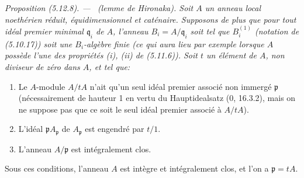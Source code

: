 \documentclass[10pt,oneside]{book}
\newenvironment{proposition}[1][]{%
  \par\medskip\noindent\itshape Proposition (#1). ---\ }{\par}
\begin{document}
\begin{proposition}[5.12.8]
\label{IV.2.s5.12.8-fr}
(lemme de Hironaka). Soit $A$ un anneau local noethérien réduit,
équidimensionnel et caténaire. Supposons de plus que pour tout idéal premier
minimal $\mathfrak q_i$ de $A$, l'anneau $B_i=A/\mathfrak q_i$ soit tel que
$B_i^{(1)}$ (notation de (5.10.17)) soit une $B_i$-algèbre finie (ce qui aura
lieu par exemple lorsque $A$ possède l'une des propriétés (i), (ii) de
(5.11.6)). Soit $t$ un élément de $A$, non diviseur de zéro dans $A$, et tel
que:
\begin{enumerate}
\item[(i)] Le $A$-module $A/tA$ n'ait qu'un seul idéal premier associé non
immergé $\mathfrak p$ (nécessairement de hauteur 1 en vertu du
Hauptidealsatz (0, 16.3.2), mais on ne suppose pas que ce soit le seul idéal
premier associé à $A/tA$).
\item[(ii)] L'idéal $\mathfrak pA_{\mathfrak p}$ de $A_{\mathfrak p}$ est
engendré par $t/1$.
\item[(iii)] L'anneau $A/\mathfrak p$ est intégralement clos.
\end{enumerate}
Sous ces conditions, l'anneau $A$ est intègre et intégralement clos, et l'on a
$\mathfrak p=tA$.
\end{proposition}
\end{document}
